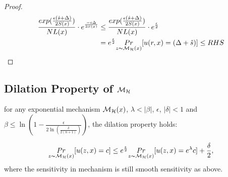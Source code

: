 \documentclass[sigconf]{acmart}
\begin{document}
\begin{proof}
\begin{equation*}
\begin{split}
\frac{exp(\frac{\epsilon (\hat{s} + \Delta)}{2 S(x)})}{NL(x)} \cdot e^{\frac{- \epsilon \Delta}{2 S(x)}}
& \leq \frac{exp(\frac{\epsilon (\hat{s} + \Delta)}{2 S(x)})}{NL(x)} \cdot e^{\frac{\epsilon}{2}}\\
&  =  e^{\frac{\epsilon}{2}} \underset{z \thicksim \mathcal{M}_{\mathcal{H}}(x)}{Pr}[u(r,x) = (\Delta + \hat{s})] \leq RHS\\
\end{split}
\end{equation*}

\end{proof}



\subsection{Dilation Property of $\mathcal{M}_{\mathcal{H}}$}
\begin{lem}
for any exponential mechanism $\mathcal{M}_{\mathcal{H}}(x)$, $\lambda < |\beta|$, $\epsilon$, $|\delta| < 1$ and $\beta \leq \ln(1 - \frac{\epsilon}{2 \ln (\frac{\delta}{2 (n + 1)})})$, the dilation property holds:

\begin{equation*}
\underset{z \thicksim \mathcal{M}_{\mathcal{H}}(x)}{Pr}[u(z,x) = c]
\leq
e^{\frac{\epsilon}{2}} \underset{z \thicksim \mathcal{M}_{\mathcal{H}}(x)}{Pr}[u(z,x) = e^{\lambda} c] + \frac{\delta}{2},
\end{equation*}
where the sensitivity in mechanism is still smooth sensitivity as above.
\end{lem}
\end{document}
